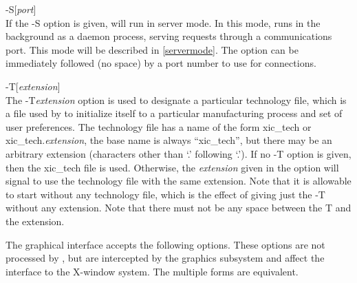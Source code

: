 \begin{description}
\item{\et -S}[{\it port\/}]\\
If the {\et -S} option is given, {\Xic} will run in server mode.  In
this mode, {\Xic} runs in the background as a daemon process, serving
requests through a communications port.  This mode will be described
in \ref{servermode}.  The option can be immediately followed (no
space) by a port number to use for connections.

\item{\et -T}[{\it extension\/}]\\
The {\et -T}{\it extension\/} option is used to designate a particular
technology file, which is a file used by {\Xic} to initialize itself
to a particular manufacturing process and set of user preferences. 
The technology file has a name of the form {\vt xic\_tech} or {\vt
xic\_tech.}{\it extension\/}, the base name is always ``xic\_tech'',
but there may be an arbitrary extension (characters other than `.'
following `.').  If no {\et -T} option is given, then the {\vt
xic\_tech} file is used.  Otherwise, the {\it extension\/} given in
the option will signal {\Xic} to use the technology file with the same
extension.  Note that it is allowable to start {\Xic} without any
technology file, which is the effect of giving just the {\et -T}
without any extension.  Note that there must not be any space between
the {\et T} and the extension.
\end{description}

The graphical interface accepts the following options.  These options
are not processed by {\Xic}, but are intercepted by the graphics
subsystem and affect the interface to the X-window system.  The
multiple forms are equivalent.

